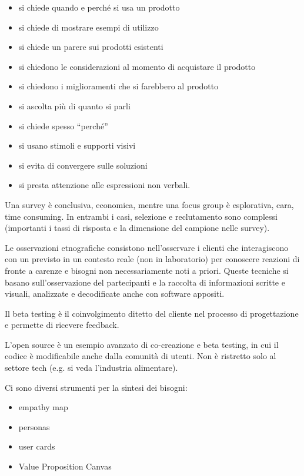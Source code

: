 \documentclass[answers, a4paper, 11pt]{exam}
\begin{document}
\begin{itemize}
    \item si chiede quando e perché si usa un prodotto
    \item si chiede di mostrare esempi di utilizzo
    \item si chiede un parere sui prodotti esistenti
    \item si chiedono le considerazioni al momento di acquistare il prodotto
    \item si chiedono i miglioramenti che si farebbero al prodotto
    \item si ascolta più di quanto si parli
    \item si chiede spesso ``perché''
    \item si usano stimoli e supporti visivi
    \item si evita di convergere sulle soluzioni
    \item si presta attenzione alle espressioni non verbali.
\end{itemize}

Una survey è conclusiva, economica, mentre una focus group è esplorativa, cara, time consuming. In entrambi i casi, selezione e reclutamento sono complessi (importanti i tassi di risposta e la dimensione del campione nelle survey).

Le osservazioni etnografiche consistono nell'osservare i clienti che interagiscono con un previsto in un contesto reale (non in laboratorio) per conoscere reazioni di fronte a carenze e bisogni non necessariamente noti a priori.
Queste tecniche si basano sull'osservazione del partecipanti e la raccolta di informazioni scritte e visuali, analizzate e decodificate anche con software appositi.

Il beta testing è il coinvolgimento ditetto del cliente nel processo di progettazione e permette di ricevere feedback.

L'open source è un esempio avanzato di co-creazione e beta testing, in cui il codice è modificabile anche dalla comunità di utenti. Non è ristretto solo al settore tech (e.g. si veda l'industria alimentare).

Ci sono diversi strumenti per la sintesi dei bisogni:
\begin{itemize}
    \item empathy map
    \item personas
    \item user cards
    \item Value Proposition Canvas
\end{itemize}
\end{document}

